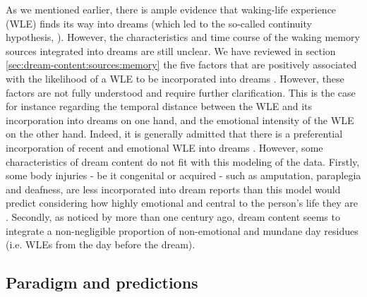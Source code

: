 As we mentioned earlier, there is ample evidence that waking-life experience (WLE) finds its way into dreams (which led to the so-called continuity hypothesis, \citealp{schredl_continuity_2003}). However, the characteristics and time course of the waking memory sources integrated into dreams are still unclear. We have reviewed in section \ref{sec:dream-content:sources:memory} the five factors that are positively associated with the likelihood of a WLE to be incorporated into dreams \citep{schredl_characteristics_2010}. However, these factors are not fully understood and require further clarification. This is the case for instance regarding the temporal distance between the WLE and its incorporation into dreams on one hand, and the emotional intensity of the WLE on the other hand. Indeed, it is generally admitted that there is a preferential incorporation of recent and emotional WLE into dreams \citep{botman_dream_1990, strauch_dem_2004, grenier_temporal_2005, schredl_factors_2006, malinowski_evidence_2014}. However, some characteristics of dream content do not fit with this modeling of the data. Firstly, some body injuries - be it congenital or acquired - such as amputation, paraplegia and deafness, are less incorporated into dream reports than this model would predict considering how highly emotional and central to the person’s life they are \citep{voss_waking_2011, saurat_walking_2011, bekrater-bodmann_post-amputation_2015}. Secondly, as noticed by \citet{freud_interpretation_1900} more than one century ago, dream content seems to integrate a non-negligible proportion of non-emotional and mundane day residues (i.e. WLEs from the day before the dream).

\subsection{Paradigm and predictions}
\label{sec:problematic:wle:predictions}

